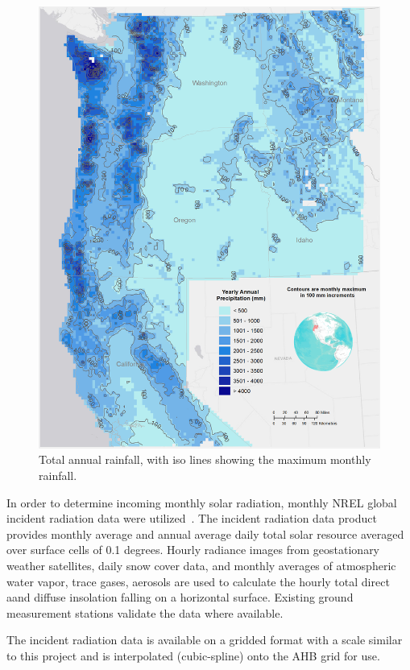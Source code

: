 \documentclass[preprint,12pt]{elsarticle}
\begin{document}
\begin{figure}[hp]
  \centering  
  \includegraphics[width=1.0\linewidth]{precip}  
\caption{Total annual rainfall, with iso lines showing the maximum monthly rainfall.}
  \label{fig:precip}
\end{figure}

In order to determine incoming monthly solar radiation, monthly
\acf{NREL} global incident radiation data were
utilized~\cite{perez2002new,nrel-l48-ghi}.  The incident radiation data product
provides monthly average and annual average daily total solar resource
averaged over surface cells of 0.1 degrees.  Hourly radiance images
from geostationary weather satellites, daily snow cover data, and
monthly averages of atmospheric water vapor, trace gases, aerosols are
used to calculate the hourly total direct aand diffuse insolation
falling on a horizontal surface.  Existing ground measurement stations
validate the data where available.

The incident radiation data is available on a gridded format with a
scale similar to this project and is interpolated (cubic-spline)
onto the \ac{AHB} grid for use.
\end{document}
